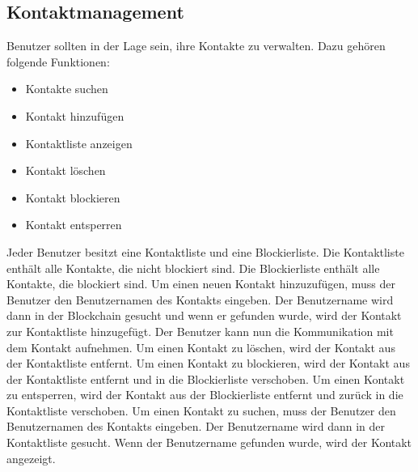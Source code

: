\subsection{Kontaktmanagement}

Benutzer sollten in der Lage sein, ihre Kontakte zu verwalten. Dazu gehören folgende Funktionen:

\begin{itemize}
    \item Kontakte suchen
    \item Kontakt hinzufügen
    \item Kontaktliste anzeigen
    \item Kontakt löschen
    \item Kontakt blockieren
    \item Kontakt entsperren
\end{itemize}

\noindent Jeder Benutzer besitzt eine Kontaktliste und eine Blockierliste. Die Kontaktliste enthält alle Kontakte,
die nicht blockiert sind. Die Blockierliste enthält alle Kontakte, die blockiert sind.
Um einen neuen Kontakt hinzuzufügen, muss der Benutzer den Benutzernamen des Kontakts eingeben. 
Der Benutzername wird dann in der Blockchain gesucht und wenn er gefunden wurde, wird der Kontakt zur 
Kontaktliste hinzugefügt. Der Benutzer kann nun die Kommunikation mit dem Kontakt aufnehmen.
Um einen Kontakt zu löschen, wird der Kontakt aus der Kontaktliste entfernt. Um einen Kontakt zu blockieren,
wird der Kontakt aus der Kontaktliste entfernt und in die Blockierliste verschoben. Um einen Kontakt zu entsperren,
wird der Kontakt aus der Blockierliste entfernt und zurück in die Kontaktliste verschoben.
Um einen Kontakt zu suchen, muss der Benutzer den Benutzernamen des Kontakts eingeben. Der Benutzername
wird dann in der Kontaktliste gesucht. Wenn der Benutzername gefunden wurde, wird der Kontakt angezeigt.
